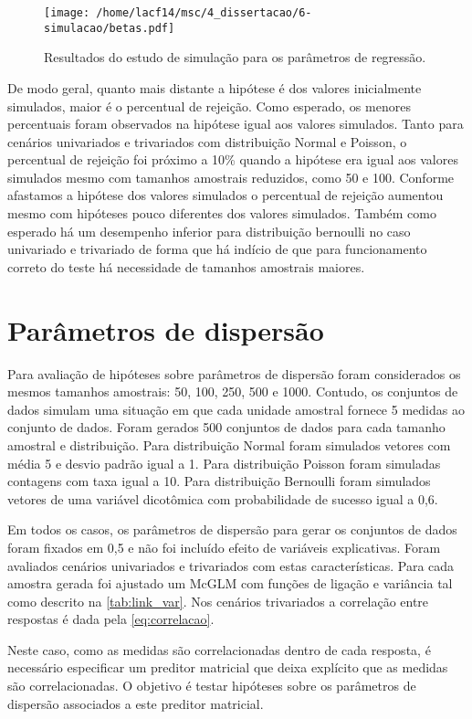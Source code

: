 \begin{figure}[H]
\centering
\texttt{[image: /home/lacf14/msc/4\_dissertacao/6-simulacao/betas.pdf]}
\caption{Resultados do estudo de simulação para os parâmetros de regressão.}
\label{fig:betas}
\end{figure}

De modo geral, quanto mais distante a hipótese é dos valores inicialmente simulados, maior é o percentual de rejeição. Como esperado, os menores percentuais foram observados na hipótese igual aos valores simulados. Tanto para cenários univariados e trivariados com distribuição Normal e Poisson, o percentual de rejeição foi próximo a 10\% quando a hipótese era igual aos valores simulados mesmo com tamanhos amostrais reduzidos, como 50 e 100. Conforme afastamos a hipótese dos valores simulados o percentual de rejeição aumentou mesmo com hipóteses pouco diferentes dos valores simulados. Também como esperado há um desempenho inferior para distribuição bernoulli no caso univariado e trivariado de forma que há indício de que para funcionamento correto do teste há necessidade de tamanhos amostrais maiores.

\section{Parâmetros de dispersão}

Para avaliação de hipóteses sobre parâmetros de dispersão foram considerados os mesmos tamanhos amostrais: 50, 100, 250, 500 e 1000. Contudo, os conjuntos de dados simulam uma situação em que cada unidade amostral fornece 5 medidas ao conjunto de dados. Foram gerados 500 conjuntos de dados para cada tamanho amostral e distribuição. Para distribuição Normal foram simulados vetores com média 5 e desvio padrão igual a 1. Para distribuição Poisson foram simuladas contagens com taxa igual a 10. Para distribuição Bernoulli foram simulados vetores de uma variável dicotômica com probabilidade de sucesso igual a 0,6.

Em todos os casos, os parâmetros de dispersão para gerar os conjuntos de dados foram fixados em 0,5 e não foi incluído efeito de variáveis explicativas. Foram avaliados cenários univariados e trivariados com estas características. Para cada amostra gerada foi ajustado um McGLM com funções de ligação e variância tal como descrito na \autoref{tab:link_var}. Nos cenários trivariados a correlação entre respostas é dada pela \autoref{eq:correlacao}.

Neste caso, como as medidas são correlacionadas dentro de cada resposta, é necessário especificar um preditor matricial que deixa explícito que as medidas são correlacionadas. O objetivo é testar hipóteses sobre os parâmetros de dispersão associados a este preditor matricial. 

